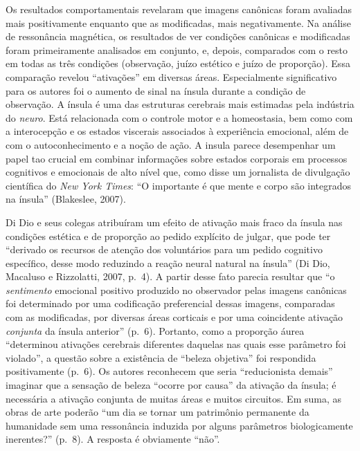 Os resultados comportamentais revelaram que imagens canônicas foram
avaliadas mais positivamente enquanto que as modificadas, mais
negativamente. Na análise de ressonância magnética, os resultados de ver
condições canônicas e modificadas foram primeiramente analisados em
conjunto, e, depois, comparados com o resto em todas as três condições
(observação, juízo estético e juízo de proporção). Essa comparação
revelou ``ativações'' em diversas áreas. Especialmente significativo
para os autores foi o aumento de sinal na ínsula durante a condição de
observação. A ínsula é uma das estruturas cerebrais mais estimadas pela
indústria do \emph{neuro}. Está relacionada com o controle motor e a
homeostasia, bem como com a interocepção e os estados viscerais
associados à experiência emocional, além de com o autoconhecimento e a
noção de ação. A insula parece desempenhar um papel tao crucial em
combinar informações sobre estados corporais em processos cognitivos e
emocionais de alto nível que, como disse um jornalista de divulgação
científica do \emph{New York Times}: ``O importante é que mente e corpo
são integrados na ínsula'' (Blakeslee, 2007).

Di Dio e seus colegas atribuíram um efeito de ativação mais fraco da
ínsula nas condições estética e de proporção ao pedido explícito de
julgar, que pode ter ``derivado os recursos de atenção dos voluntários
para um pedido cognitivo específico, desse modo reduzindo a reação
neural natural na ínsula'' (Di Dio, Macaluso e Rizzolatti, 2007, p.~4). A
partir desse fato parecia resultar que ``o \emph{sentimento} emocional
positivo produzido no observador pelas imagens canônicas foi determinado
por uma codificação preferencial dessas imagens, comparadas com as
modificadas, por diversas áreas corticais e por uma coincidente ativação
\emph{conjunta} da ínsula anterior'' (p.~6). Portanto, como a proporção
áurea ``determinou ativações cerebrais diferentes daquelas nas quais
esse parâmetro foi violado'', a questão sobre a existência de ``beleza
objetiva'' foi respondida positivamente (p.~6). Os autores reconhecem que
seria ``reducionista demais'' imaginar que a sensação de beleza ``ocorre
por causa'' da ativação da ínsula; é necessária a ativação conjunta de
muitas áreas e muitos circuitos. Em suma, as obras de arte poderão ``um
dia se tornar um patrimônio permanente da humanidade sem uma ressonância
induzida por alguns parâmetros biologicamente inerentes?'' (p.~8). A
resposta é obviamente ``não''.

